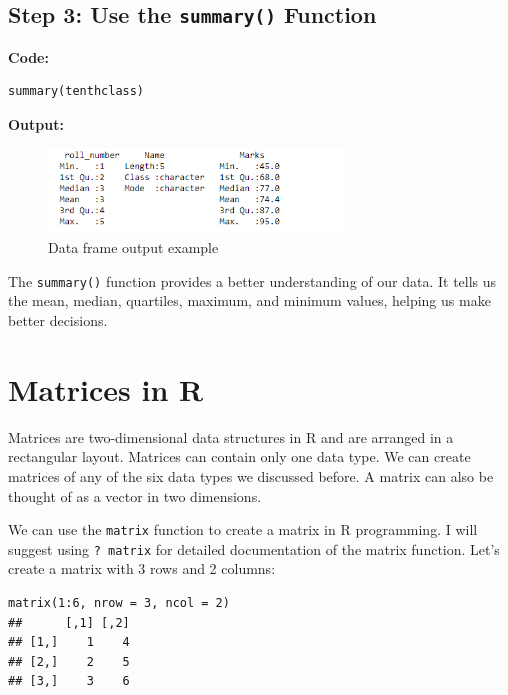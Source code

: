 \documentclass[12pt]{book}
\begin{document}
\subsection{Step 3: Use the \texttt{summary()} Function}

\textbf{Code:}
\begin{verbatim}
summary(tenthclass)
\end{verbatim}

\textbf{Output:}
\begin{figure}[h]
    \begin{flushleft}
        \includegraphics[width=0.7\textwidth]{Data-Frames-in-R-1-3.png} %
        \caption{Data frame output example}
        \label{fig:dataframe}
    \end{flushleft}
\end{figure}

The \texttt{summary()} function provides a better understanding of our data. It tells us the mean, median, quartiles, maximum, and minimum values, helping us make better decisions.













\section{Matrices in R}

Matrices are two-dimensional data structures in R and are arranged in a rectangular layout. Matrices can contain only one data type. We can create matrices of any of the six data types we discussed before. A matrix can also be thought of as a vector in two dimensions.

We can use the \texttt{matrix} function to create a matrix in R programming. I will suggest using \texttt{? matrix} for detailed documentation of the matrix function. Let’s create a matrix with 3 rows and 2 columns:

\begin{verbatim}
matrix(1:6, nrow = 3, ncol = 2)
##      [,1] [,2]
## [1,]    1    4
## [2,]    2    5
## [3,]    3    6
\end{verbatim}
\end{document}

